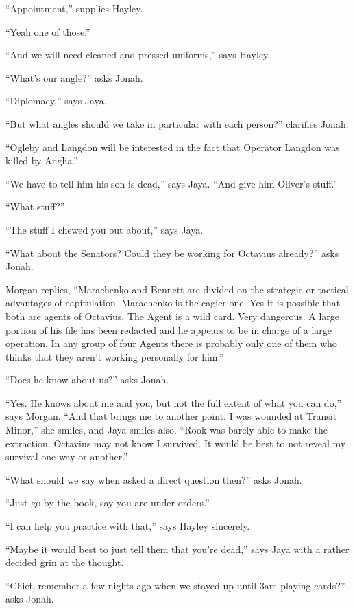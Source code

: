 ``Appointment,'' supplies Hayley.

``Yeah one of those.''

``And we will need cleaned and pressed uniforms,'' says Hayley.

``What's our angle?'' asks Jonah.

``Diplomacy,'' says Jaya.

``But what angles should we take in particular with each person?'' clarifies Jonah.

``Ogleby and Langdon will be interested in the fact that Operator Langdon was killed by Anglia.''

``We have to tell him his son is dead,'' says Jaya.  ``And give him Oliver's stuff.''

``What stuff?''

``The stuff I chewed you out about,'' says Jaya.

``What about the Senators?  Could they be working for Octavius already?'' asks Jonah.

Morgan replies, ``Marachenko and Bennett are divided on the strategic or tactical advantages of capitulation.  Marachenko is the cagier one.  Yes it is possible that both are agents of Octavius.  The Agent is a wild card. Very dangerous.  A large portion of his file has been redacted and he appears to be in charge of a large operation.  In any group of four Agents there is probably only one of them who thinks that they aren't working personally for him.''

``Does he know about us?'' asks Jonah.

``Yes.  He knows about me and you, but not the full extent of what you can do,'' says Morgan.  ``And that brings me to another point.  I was wounded at Transit Minor,'' she smiles, and Jaya smiles also.  ``Rook was barely able to make the extraction.  Octavius may not know I survived.  It would be best to not reveal my survival one way or another.''

``What should we say when asked a direct question then?'' asks Jonah.

``Just go by the book, say you are under orders.''

``I can help you practice with that,'' says Hayley sincerely.

``Maybe it would best to just tell them that you're dead,'' says Jaya with a rather decided grin at the thought.

``Chief, remember a few nights ago when we stayed up until 3am playing cards?'' asks Jonah.

